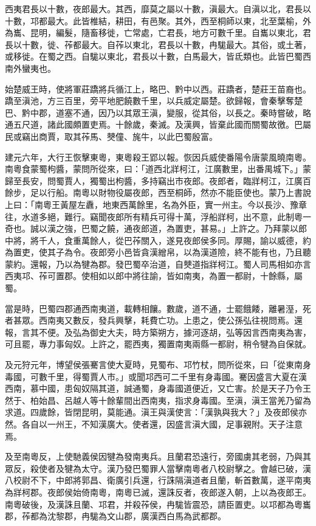 
\begin{pinyinscope}
西夷君長以十數，夜郎最大。其西，靡莫之屬以十數，滇最大。自滇以北，君長以十數，邛都最大。此皆椎結，耕田，有邑聚。其外，西至桐師以東，北至葉榆，外為巂、昆明，編髮，隨畜移徙，亡常處，亡君長，地方可數千里。自巂以東北，君長以十數，徙、莋都最大。自莋以東北，君長以十數，冉駹最大。其俗，或土著，或移徙。在蜀之西。自駹以東北，君長以十數，白馬最大，皆氐類也。此皆巴蜀西南外蠻夷也。

始楚威王時，使將軍莊蹻將兵循江上，略巴、黔中以西。莊蹻者，楚莊王苗裔也。蹻至滇池，方三百里，旁平地肥饒數千里，以兵威定屬楚。欲歸報，會秦擊奪楚巴、黔中郡，道塞不通，因乃以其眾王滇，變服，從其俗，以長之。秦時嘗破，略通五尺道，諸此國頗置吏焉。十餘歲，秦滅。及漢興，皆棄此國而關蜀故徼。巴屬民或竊出商賈，取其莋馬、僰僮、旄牛，以此巴蜀殷富。

建元六年，大行王恢擊東粵，東粵殺王郢以報。恢因兵威使番陽令唐蒙風曉南粵。南粵食蒙蜀枸醬，蒙問所從來，曰：「道西北牂柯江，江廣數里，出番禺城下。」蒙歸至長安，問蜀賈人，獨蜀出枸醬，多持竊出市夜郎。夜郎者，臨牂柯江，江廣百餘步，足以行船。南粵以財物役屬夜郎，西至桐師，然亦不能臣使也。蒙乃上書說上曰：「南粵王黃屋左纛，地東西萬餘里，名為外臣，實一州主。今以長沙、豫章往，水道多絕，難行。竊聞夜郎所有精兵可得十萬，浮船牂柯，出不意，此制粵一奇也。誠以漢之強，巴蜀之饒，通夜郎道，為置吏，甚易。」上許之。乃拜蒙以郎中將，將千人，食重萬餘人，從巴莋關入，遂見夜郎侯多同。厚賜，諭以威德，約為置吏，使其子為令。夜郎旁小邑皆貪漢繒帛，以為漢道險，終不能有也，乃且聽蒙約。還報，乃以為犍為郡。發巴蜀卒治道，自僰道指牂柯江。蜀人司馬相如亦言西夷邛、莋可置郡。使相如以郎中將往諭，皆如南夷，為置一都尉，十餘縣，屬蜀。

當是時，巴蜀四郡通西南夷道，載轉相饟。數歲，道不通，士罷餓餧，離暑溼，死者甚眾。西南夷又數反，發兵興擊，耗費亡功。上患之，使公孫弘往視問焉。還報，言其不便。及弘為御史大夫，時方築朔方，據河逐胡，弘等因言西南夷為害，可且罷，專力事匈奴。上許之，罷西夷，獨置南夷兩縣一都尉，稍令犍為自保就。

及元狩元年，博望侯張騫言使大夏時，見蜀布、邛竹杖，問所從來，曰「從東南身毒國，可數千里，得蜀賈人市。」或聞邛西可二千里有身毒國。騫因盛言大夏在漢西南，慕中國，患匈奴隔其道，誠通蜀，身毒國道便近，又亡害。於是天子乃令王然于、柏始昌、呂越人等十餘輩間出西南夷，指求身毒國。至滇，滇王當羌乃留為求道。四歲餘，皆閉昆明，莫能通。滇王與漢使言：「漢孰與我大？」及夜郎侯亦然。各自以一州王，不知漢廣大。使者還，因盛言滇大國，足事親附。天子注意焉。

及至南粵反，上使馳義侯因犍為發南夷兵。且蘭君恐遠行，旁國虜其老弱，乃與其眾反，殺使者及犍為太守。漢乃發巴蜀罪人當擊南粵者八校尉擊之。會越已破，漢八校尉不下，中郎將郭昌、衛廣引兵還，行誅隔滇道者且蘭，斬首數萬，遂平南夷為牂柯郡。夜郎侯始倚南粵，南粵已滅，還誅反者，夜郎遂入朝，上以為夜郎王。南粵破後，及漢誅且蘭、邛君，并殺莋侯，冉駹皆震恐，請臣置吏。以邛都為粵巂郡，莋都為沈黎郡，冉駹為文山郡，廣漢西白馬為武都郡。


\end{pinyinscope}
